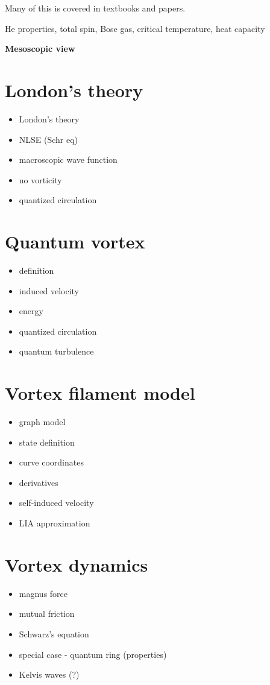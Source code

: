 Many of this is covered in textbooks and papers.

He properties, total spin, Bose gas, critical temperature, heat capacity

\newpage

{\Huge \bfseries Mesoscopic view}
\vspace{0.3cm}

\section{London's theory}
\begin{itemize}
	\item London's theory
	\item NLSE (Schr eq)
	\item macroscopic wave function
	\item no vorticity
	\item quantized circulation
\end{itemize}

\section{Quantum vortex}
\begin{itemize}
	\item definition
	\item induced velocity
	\item energy
	\item quantized circulation
	\item quantum turbulence
\end{itemize}

\section{Vortex filament model}
\begin{itemize}
	\item graph model
	\item state definition
	\item curve coordinates
	\item derivatives
	\item self-induced velocity
	\item LIA approximation
\end{itemize}

\section{Vortex dynamics}
\begin{itemize}
	\item magnus force
	\item mutual friction
	\item Schwarz's equation
	\item special case - quantum ring (properties)
	\item Kelvis waves (?)
\end{itemize}

